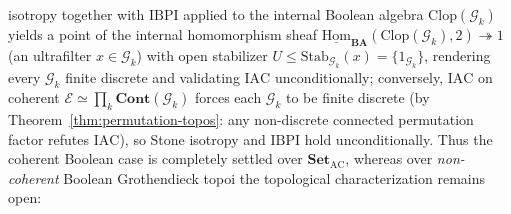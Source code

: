 isotropy together with $\mathrm{IBPI}$ applied to the internal Boolean algebra $\mathrm{Clop}(\mathcal{G}_k)$ yields a point of the internal homomorphism sheaf $\underline{\mathrm{Hom}}_{\mathbf{BA}}(\mathrm{Clop}(\mathcal{G}_k), 2) \twoheadrightarrow 1$ (an ultrafilter $x \in \mathcal{G}_k$) with open stabilizer $U \le \mathrm{Stab}_{\mathcal{G}_k}(x) = \{1_{\mathcal{G}_k}\}$, rendering every $\mathcal{G}_k$ finite discrete and validating $\mathrm{IAC}$ unconditionally; conversely, $\mathrm{IAC}$ on coherent $\mathcal{E} \simeq \prod_k \mathbf{Cont}(\mathcal{G}_k)$ forces each $\mathcal{G}_k$ to be finite discrete (by Theorem~\ref{thm:permutation-topos}: any non-discrete connected permutation factor refutes $\mathrm{IAC}$), so Stone isotropy and $\mathrm{IBPI}$ hold unconditionally. Thus the coherent Boolean case is completely settled over $\mathbf{Set}_{\mathrm{AC}}$, whereas over \emph{non-coherent} Boolean Grothendieck topoi the topological characterization remains open:

